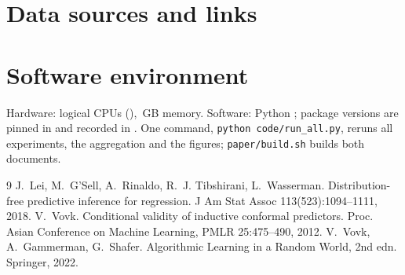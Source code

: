 \documentclass[11pt]{article}
\begin{document}
\clearpage
\section{Data sources and links}\label{sec:datalinks}


\section{Software environment}\label{sec:env}
Hardware: \NHwNcpu{} logical CPUs (\NHwCpu{}), \NHwRam{}\,GB memory. Software: Python \NHwPython{}; package versions are pinned in  and recorded in . One command, \texttt{python code/run\_all.py}, reruns all experiments, the aggregation and the figures; \texttt{paper/build.sh} builds both documents.


\begin{thebibliography}{9}
 J.~Lei, M.~G'Sell, A.~Rinaldo, R.~J. Tibshirani, L.~Wasserman. Distribution-free predictive inference for regression. J Am Stat Assoc 113(523):1094--1111, 2018.
 V.~Vovk. Conditional validity of inductive conformal predictors. Proc. Asian Conference on Machine Learning, PMLR 25:475--490, 2012.
 V.~Vovk, A.~Gammerman, G.~Shafer. Algorithmic Learning in a Random World, 2nd edn. Springer, 2022.
\end{thebibliography}
\end{document}
